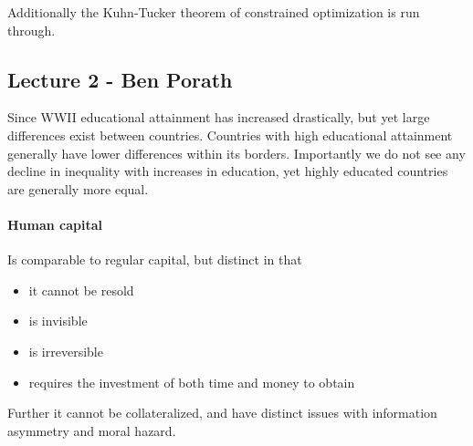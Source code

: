 \documentclass[12pt, a4paper]{article}
\begin{document}
\begin{multicols}{2}
Additionally the Kuhn-Tucker theorem of constrained optimization is run through.

\subsection{Lecture 2 - Ben Porath}
Since WWII educational attainment has increased drastically, but yet large differences exist between countries. Countries with high educational attainment generally have lower differences within its borders. Importantly we do not see any decline in inequality with increases in education, yet highly educated countries are generally more equal.

\paragraph{Human capital}
Is comparable to regular capital, but distinct in that
\begin{itemize}
\item it cannot be resold
\item is invisible
\item is irreversible
\item requires the investment of both time and money to obtain
\end{itemize}
Further it cannot be collateralized, and have distinct issues with information asymmetry and moral hazard.


\end{multicols}
\end{document}
